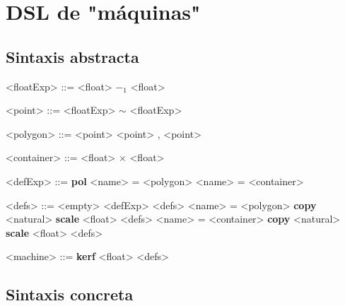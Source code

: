 \documentclass[a4paper,10pt]{article}
\begin{document}
\section*{DSL de "máquinas"}
\setlength{\leftskip}{0.4cm}
\subsection*{Sintaxis abstracta}
\large

\begin{grammar}
<floatExp> ::= <float>
    \alt $-_{1}$ <float>

<point> ::= <floatExp> $\sim$ <floatExp>

<polygon> ::= <point>
    \alt <point> , <point>

<container> ::= <float> $\times$ <float>

<defExp> ::= {\bfseries pol} <name> = <polygon>
     <name> = <container>

<defs> ::= <empty>
    \alt <defExp> <defs>
     <name> = <polygon> {\bfseries copy} <natural> {\bfseries scale} <float> <defs>
     <name> = <container> {\bfseries copy} <natural> {\bfseries scale} <float> <defs>

<machine> ::= {\bfseries kerf} <float> <defs>
\end{grammar}

\normalfont

\setlength{\leftskip}{0.4cm}
\subsection*{Sintaxis concreta}
\end{document}
